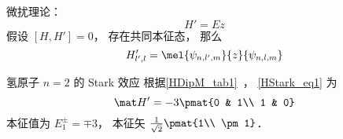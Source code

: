 
\begin{issues}
\issueDraft
\end{issues}


微扰理论：
\begin{equation}
H' = E z
\end{equation}
假设 $[H, H'] = 0$， 存在共同本征态， 那么
\begin{equation}\label{HStark_eq1}
H'_{l',l} = \mel{\psi_{n,l',m}}{z}{\psi_{n,l,m}}
\end{equation}


\begin{example}{氢原子 $n=2$ 的 Stark 效应}
根据\autoref{HDipM_tab1}~， \autoref{HStark_eq1} 为
\begin{equation}
\mat H' = -3\pmat{0 & 1\\ 1 & 0}
\end{equation}
本征值为 $E_1^{\pm} = \mp 3$， 本征矢 $ \frac{1}{\sqrt 2}\pmat{1\\ \pm 1}$．
\end{example}
